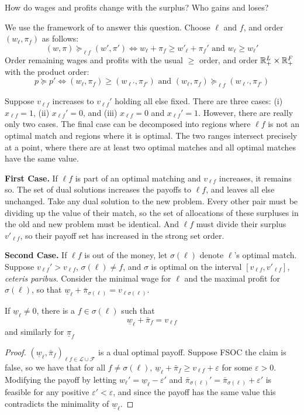 \documentclass[10pt]{article}
\begin{document}
\begin{question}
	How do wages and profits change with the surplus? Who gains and loses? 
\end{question}
\begin{remark}
	We use the framework of  to answer this question. Choose $\ell$ and $f$, and order $(w_\ell,\pi_f)$ as follows: \[(w,\pi) \succeq_{\ell f} (w',\pi') \Longleftrightarrow w_\ell + \pi_f \ge w'_\ell + \pi_f' \text{ and } w_\ell \ge w_\ell'\]Order remaining wages and profits with the usual $\ge$ order, and order $\mathbb{R}^L_+ \times \mathbb{R}^F_+$ with the product order:\[p \succeq p' \Longleftrightarrow (w_\ell ,\pi_f) \ge (w_{\ell'},\pi_{f'}) \text{ and } (w_\ell,\pi_f) \succeq_{\ell f} (w_{\ell'},\pi_{f'})\]
	
	Suppose $v_{\ell f}$ increases to $v_{\ell f}'$ holding all else fixed. There are three cases: (i) $x_{\ell f} = 1$, (ii) $x_{\ell f}' = 0$, and (iii) $x_{\ell f} = 0$ and $x_{\ell f} ' = 1$. However, there are really only two cases. The final case can be decomposed into regions where $\ell f$ is not an optimal match and regions where it is optimal. The two ranges intersect precisely at a point, where there are at least two optimal matches and all optimal matches have the same value. 
	
	\textbf{First Case.} If $\ell f$ is part of an optimal matching and $v_{\ell f}$ increases, it remains so. The set of dual solutions increases the payoffs to $\ell f$, and leaves all else unchanged. Take any dual solution to the new problem. Every other pair must be dividing up the value of their match, so the set of allocations of these surpluses in the old and new problem must be identical. And $\ell f$ must divide their surplus $v'_{\ell f}$, so their payoff set has increased in the strong set order. 
	
	\textbf{Second Case.} If $\ell f$ is out of the money, let $\sigma(\ell)$ denote $\ell$'s optimal match. Suppose $v_{\ell f}' > v_{\ell f}$, $\sigma(\ell) \ne f$, and $\sigma$ is optimal on the interval $[v_{\ell f} ,v'_{\ell f}]$, \emph{ceteris paribus}. Consider the minimal wage for $\ell$ and the maximal profit for $\sigma(\ell)$, so that $\underline{w}_\ell + \bar{\pi}_{\sigma(\ell)} = v_{\ell \sigma(\ell)}$.
	
	\begin{lemma}
		If $\underline{w}_\ell \ne 0$, there is a $f \in \sigma(\ell)$ such that\[\underline{w}_\ell + \bar{\pi}_f = v_{\ell f}\]and similarly for $\underline{\pi}_f$
	\end{lemma}
	\begin{proof}
		$(\underline{w}_\ell,\bar{\pi}_f)_{\ell f \in \mathcal{L} \cup \mathcal{F}}$ is a dual optimal payoff. Suppose FSOC the claim is false, so we have that for all $f \ne \sigma(\ell)$, $\underline{w}_\ell + \bar{\pi}_f \ge v_{\ell f} + \varepsilon$ for some $\varepsilon > 0$. Modifying the payoff by letting $w_\ell' = \underline{w}_\ell - \varepsilon'$ and $\bar{\pi}_{\sigma(\ell)}' = \bar{\pi}_{\sigma(\ell)} + \varepsilon'$ is feasible for any positive $\varepsilon' < \varepsilon$, and since the payoff has the same value this contradicts the minimality of $\underline{w}_\ell$. 
	\end{proof}
	

\end{remark}
\end{document}
